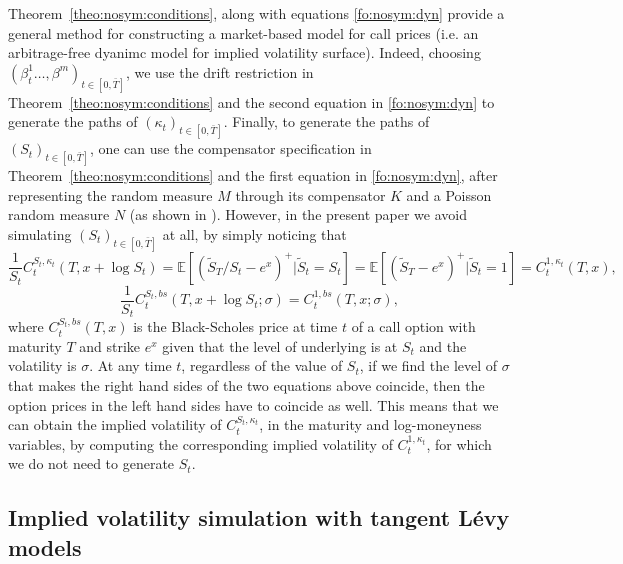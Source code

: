 \documentclass{article}
\numberwithin{equation}{section}
\newcommand\EE {\mathbb E}
\begin{document}
Theorem~\ref{theo:nosym:conditions}, along with equations \eqref{fo:nosym:dyn} provide a general method for constructing a market-based model for call prices (i.e. an arbitrage-free dyanimc model for implied volatility surface). Indeed, choosing $(\beta^1_t\ldots,\beta^m)_{t\in[0,\bar{T}]}$, we use the drift restriction in Theorem~\ref{theo:nosym:conditions} and the second equation in \eqref{fo:nosym:dyn} to generate the paths of $(\kappa_t)_{t\in[0,\bar{T}]}$. Finally, to generate the paths of $(S_t)_{t\in[0,\bar{T}]}$, one can use the compensator specification in Theorem~\ref{theo:nosym:conditions} and the first equation in \eqref{fo:nosym:dyn}, after representing the random measure $M$ through its compensator $K$ and a Poisson random measure $N$ (as shown in \cite{carmona2010tangentlevy}). However, in the present paper we avoid simulating $(S_t)_{t\in[0,\bar{T}]}$ at all, by simply noticing that
$$
\frac{1}{S_t}C_t^{S_t,\kappa_t}(T,x+\log S_t) = \EE \left[(\tilde{S}_T/S_t - e^x)^+ | \tilde{S}_t = S_t \right]
= \EE \left[(\tilde{S}_T - e^x)^+ | \tilde{S}_t = 1 \right]
= C_t^{1,\kappa_t}(T,x),
$$
$$
\frac{1}{S_t}C_t^{S_t,bs}(T,x+\log S_t;\sigma) = C_t^{1,bs}(T,x;\sigma),
$$
where $C_t^{S_t,bs}(T,x)$ is the Black-Scholes price at time $t$ of a call option with maturity $T$ and strike $e^x$ given that the level of underlying is at $S_t$ and the volatility is $\sigma$. At any time $t$, regardless of the value of $S_t$, if we find the level of $\sigma$ that makes the right hand sides of the two equations above coincide, then the option prices in the left hand sides have to coincide as well. This means that we can obtain the implied volatility of $C_t^{S_t,\kappa_t}$, in the maturity and log-moneyness variables, by computing the corresponding implied volatility of $C_t^{1,\kappa_t}$, for which we do not need to generate $S_t$.




\subsection{Implied volatility simulation with tangent L\'{e}vy models\label{sec:implementation}}
\end{document}
